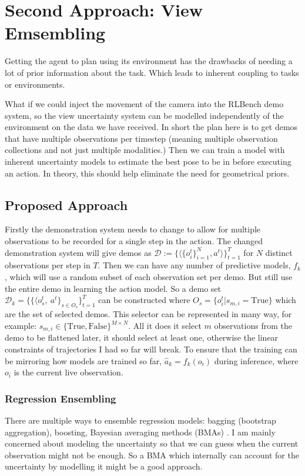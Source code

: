 \section{Second Approach: View Emsembling}
Getting the agent to plan using its environment has the drawbacks of needing a lot of prior information about the task. Which leads to inherent coupling to tasks or environments.

What if we could inject the movement of the camera into the RLBench demo system, so the view uncertainty system can be modelled independently of the environment on the data we have received. In short the plan here is to get demos that have multiple observations per timestep (meaning multiple observation collections and not just multiple modalities.) Then we can train a model with inherent uncertainty models to estimate the best pose to be in before executing an action. In theory, this should help eliminate the need for geometrical priors.

\subsection{Proposed Approach}
Firstly the demonstration system needs to change to allow for multiple observations to be recorded for a single step in the action. The changed demonstration system will give demos as \( \mathcal{D} := \{\langle \{o_i^t\}_{i = 1}^{N}, a^t\rangle\}_{t = 1}^{T}\) for $N$ distinct observations per step in $T$. Then we can have any number of predictive models, $f_k$, which will use a random subset of each observation set per demo. But still use the entire demo in learning the action model. So a demo set \(\mathcal{D}_k = \{\{ \langle o_s^t, ~a^t \}_{s \in O_s} \}_{t = 1}^T\) can be constructed where \(O_s = \{o_i^t | s_{m, i} = \text{True}\}\) which are the set of selected demos. This selector can be represented in many way, for example: \(s_{m, i} \in \{\text{True}, \text{False}\}^{M \times N}\). All it does it select $m$ observations from the demo to be flattened later, it should select at least one, otherwise the linear constraints of trajectories I had so far will break.
To ensure that the training can be mirroring how models are trained so far, \(\hat{a}_k = f_k\left(o_i\right)\) during inference, where $o_i$ is the current live observation.

\subsubsection{Regression Ensembling}
There are multiple ways to ensemble regression models: bagging (bootstrap aggregation)\cite{Breiman1996}, boosting, Bayesian averaging methods (BMAs) \cite{saito2024uncertaintyquantificationmassmodels,tang2014towards}. I am mainly concerned about modeling the uncertainty so that we can guess when the current observation might not be enough. So a BMA which internally can account for the uncertainty by modelling it might be a good approach.

